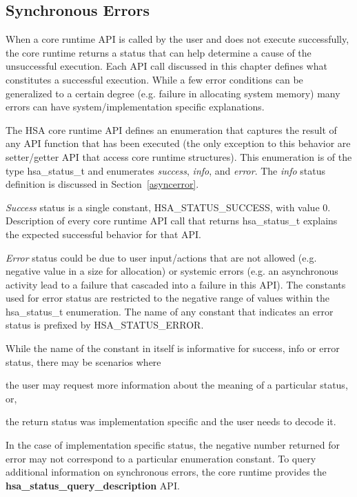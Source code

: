 \documentclass[draft]{book}
\newcommand{\reffun}[1]{\textbf{#1}}
\newcommand{\reftyp}[1]{#1}
\newcommand{\refenu}[1]{\reftyp{#1}}
\begin{document}
\hypertarget{syncerror}{}\subsection{Synchronous Errors }\label{syncerror}

When a core runtime API is called by the user and does not execute successfully,
the core runtime returns a status that can help determine a cause of the
unsuccessful execution. Each API call discussed in this chapter defines what
constitutes a successful execution. While a few error conditions can be
generalized to a certain degree (e.g. failure in allocating system memory) many
errors can have system/implementation specific explanations.

The HSA core runtime API defines an enumeration that captures the result of any
API function that has been executed (the only exception to this behavior are
setter/getter API that access core runtime structures). This enumeration is of
the type \reftyp{hsa_status_t} and enumerates \textit{success}, \textit{info},
and \textit{error}. The \textit{info} status definition is discussed in
Section~\ref{asyncerror}.

\textit{Success} status is a single constant, \refenu{HSA_STATUS_SUCCESS},
with value 0. Description of every core runtime API call that returns
\reftyp{hsa_status_t} explains the expected successful behavior for that API.

\textit{Error} status could be due to user input/actions that are not allowed
(e.g. negative value in a size for allocation) or systemic errors (e.g. an
asynchronous activity lead to a failure that cascaded into a failure in this
API). The constants used for error status are restricted to the negative range
of values within the \reftyp{hsa_status_t} enumeration. The name of any constant
that indicates an error status is prefixed by \refenu{HSA_STATUS_ERROR}.

While the name of the constant in itself is informative for success, info or
error status, there may be scenarios where\begin{inparaenum}[(i)]\item the user
  may request more information about the meaning of a particular status,
  or, \item the return status was implementation specific and the user needs to
  decode it.
\end{inparaenum} In the case of implementation specific status, the negative
number returned for error may not correspond to a particular enumeration
constant. To query additional information on synchronous errors, the core
runtime provides the \reffun{hsa_status_query_description} API.
\end{document}
